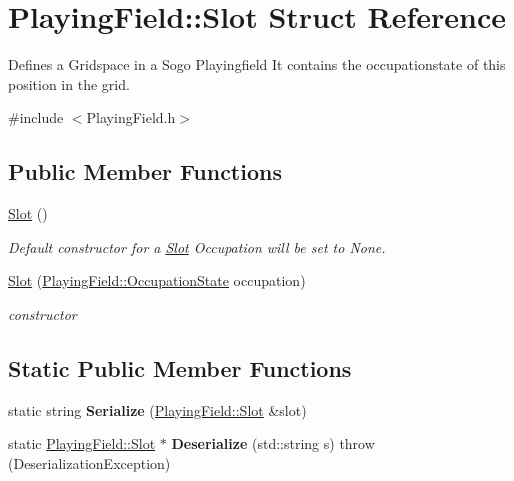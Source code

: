 \hypertarget{structPlayingField_1_1Slot}{\section{Playing\-Field\-:\-:Slot Struct Reference}
\label{structPlayingField_1_1Slot}
}


Defines a Gridspace in a Sogo Playingfield It contains the occupationstate of this position in the grid.  




{\ttfamily \#include $<$Playing\-Field.\-h$>$}

\subsection*{Public Member Functions}
\begin{DoxyCompactItemize}
\item 
\hypertarget{structPlayingField_1_1Slot_a2c572050c538c2d445597984a14df2a6}{\hyperlink{structPlayingField_1_1Slot_a2c572050c538c2d445597984a14df2a6}{Slot} ()}\label{structPlayingField_1_1Slot_a2c572050c538c2d445597984a14df2a6}

\begin{DoxyCompactList}\small\item\em Default constructor for a \hyperlink{structPlayingField_1_1Slot}{Slot} Occupation will be set to None. \end{DoxyCompactList}\item 
\hyperlink{structPlayingField_1_1Slot_ad56b4d9838d1475763c131bf310ae2d0}{Slot} (\hyperlink{classPlayingField_ac6df152a3f820aa04a00ab4df4a9d265}{Playing\-Field\-::\-Occupation\-State} occupation)
\begin{DoxyCompactList}\small\item\em constructor \end{DoxyCompactList}\end{DoxyCompactItemize}
\subsection*{Static Public Member Functions}
\begin{DoxyCompactItemize}
\item 
\hypertarget{structPlayingField_1_1Slot_a5e3099180f76f2445bcd763e006cb699}{static string {\bfseries Serialize} (\hyperlink{structPlayingField_1_1Slot}{Playing\-Field\-::\-Slot} \&slot)}\label{structPlayingField_1_1Slot_a5e3099180f76f2445bcd763e006cb699}

\item 
\hypertarget{structPlayingField_1_1Slot_a0fcde2d0e771a75bd43d8b72364c159b}{static \hyperlink{structPlayingField_1_1Slot}{Playing\-Field\-::\-Slot} $\ast$ {\bfseries Deserialize} (std\-::string s)  throw (\-Deserialization\-Exception)}\label{structPlayingField_1_1Slot_a0fcde2d0e771a75bd43d8b72364c159b}

\end{DoxyCompactItemize}
